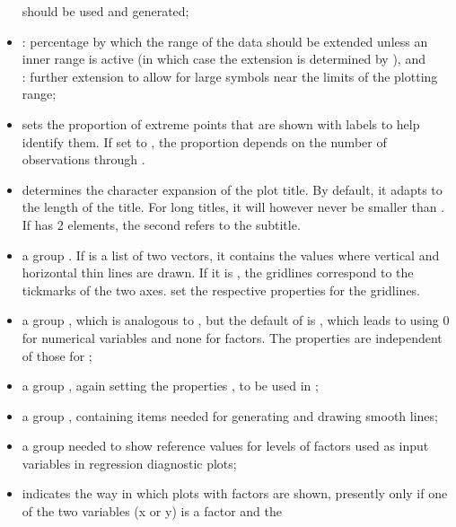 \documentclass[11pt]{article}\usepackage[]{graphicx}\usepackage[]{color}
\begin{document}
\begin{itemize}
  should be used and generated;
\item
  : percentage by which the range of the data should be
  extended unless an inner range is active (in which case the extension 
  is determined by ), and\\
  : further extension to allow for large symbols near the 
  limits of the plotting range;
\item
   sets the proportion of extreme points that are shown 
  with labels to help identify them.
  If set to , the proportion depends on the number  of
  observations through .
\item
   determines the character expansion of the plot title.
  By default, it adapts to the length of the title.
  For long titles, it will however never be smaller than
  . 
  If  has 2 elements, the second refers to the subtitle.
\item
  a group . If  is a list of two vectors,
  it contains the values where vertical and horizontal thin lines are drawn.
  If it is , the gridlines correspond to the tickmarks of the
  two axes.
   set the respective
  properties for the gridlines.
\item
  a group , which is analogous to , but the
  default of  is , which leads to using 
  0 for numerical variables and none for factors. 
  The properties are independent of those for ;
\item
  a group , again setting the properties ,
  to be used in ;
\item
  a group , containing items needed for generating and drawing
  smooth lines;
  \label{options.smooth}
\item
  a group  needed to show reference values for levels of factors
  used as input variables in regression diagnostic plots;
\item
   indicates the way in which plots with factors are shown,
  presently only if one of the two variables (x or y) is a factor and the

\end{itemize}
\end{document}
